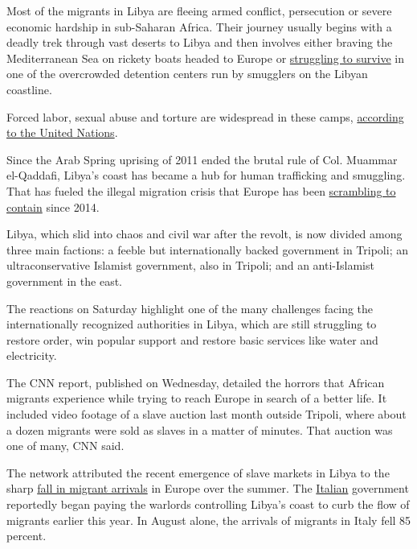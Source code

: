 Most of the migrants in Libya are fleeing armed conflict, persecution or
severe economic hardship in sub-Saharan Africa. Their journey usually
begins with a deadly trek through vast deserts to Libya and then
involves either braving the Mediterranean Sea on rickety boats headed to
Europe or
\href{https://www.nytimes3xbfgragh.onion/2017/09/12/world/africa/migrants-africa-libya.html}{struggling
to survive} in one of the overcrowded detention centers run by smugglers
on the Libyan coastline.

Forced labor, sexual abuse and torture are widespread in these camps,
\href{http://www.ohchr.org/Documents/Countries/LY/DetainedAndDehumanised_en.pdf}{according
to the United Nations}.

Since the Arab Spring uprising of 2011 ended the brutal rule of Col.
Muammar el-Qaddafi, Libya's coast has became a hub for human trafficking
and smuggling. That has fueled the illegal migration crisis that Europe
has been
\href{https://www.nytimes3xbfgragh.onion/2017/08/28/world/europe/africa-migrants-europe.html}{scrambling
to contain} since 2014.

Libya, which slid into chaos and civil war after the revolt, is now
divided among three main factions: a feeble but internationally backed
government in Tripoli; an ultraconservative Islamist government, also in
Tripoli; and an anti-Islamist government in the east.

The reactions on Saturday highlight one of the many challenges facing
the internationally recognized authorities in Libya, which are still
struggling to restore order, win popular support and restore basic
services like water and electricity.

The CNN report, published on Wednesday, detailed the horrors that
African migrants experience while trying to reach Europe in search of a
better life. It included video footage of a slave auction last month
outside Tripoli, where about a dozen migrants were sold as slaves in a
matter of minutes. That auction was one of many, CNN said.

The network attributed the recent emergence of slave markets in Libya to
the sharp
\href{https://www.nytimes3xbfgragh.onion/2017/08/18/world/europe/migrant-crisis-italy-libya.html?rref=collection\%2Fbyline\%2Fpatrick-kingsley\&action=click\&contentCollection=undefined\&region=stream\&module=stream_unit\&version=latest\&contentPlacement=25\&pgtype=collection}{fall
in migrant arrivals} in Europe over the summer. The
\href{https://www.nytimes3xbfgragh.onion/2017/09/17/world/europe/italy-libya-migrant-crisis.html}{Italian}
government reportedly began paying the warlords controlling Libya's
coast to curb the flow of migrants earlier this year. In August alone,
the arrivals of migrants in Italy fell 85 percent.

